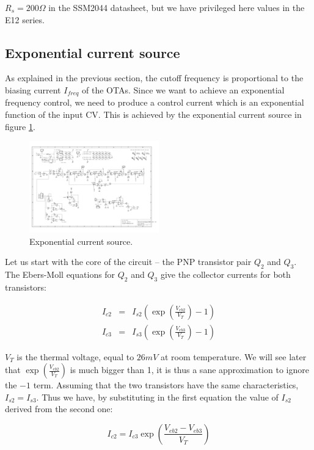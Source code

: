 \documentclass[a4paper,11pt]{article}
\begin{document}
$R_s = 200 \Omega$ in the SSM2044 datasheet, but we have privileged here values in the E12 series.

\subsection{Exponential current source}

As explained in the previous section, the cutoff frequency is proportional to the biasing current $I_{freq}$ of the OTAs. Since we want to achieve an exponential frequency control, we need to produce a control current which is an exponential function of the input CV. This is achieved by the exponential current source in figure \ref{fig:expo}.

\begin{figure}
\centering
\includegraphics[width=0.5\textwidth]{smr4mkII_expo_current_source.pdf}
\caption{Exponential current source.}
\label{fig:expo}
\end{figure}

Let us start with the core of the circuit -- the PNP transistor pair $Q_2$ and $Q_3$. The Ebers-Moll equations for $Q_2$ and $Q_3$ give the collector currents for both transistors:

\begin{eqnarray}
I_{c2} &=& I_{s2} \left(\exp \left( \frac{V_{eb2}}{V_T} \right) - 1 \right) \\
I_{c3} &=& I_{s3} \left(\exp \left( \frac{V_{eb3}}{V_T} \right) - 1 \right)
\end{eqnarray}

$V_T$ is the thermal voltage, equal to $26 mV$ at room temperature. We will see later that $\exp \left( \frac{V_{eb2}}{V_T} \right)$ is much bigger than 1, it is thus a sane approximation to ignore the $- 1$ term. Assuming that the two transistors have the same characteristics, $I_{s2} = I_{s3}$. Thus we have, by substituting in the first equation the value of $I_{s2}$ derived from the second one:

\begin{equation}
I_{c2} = I_{c3} \exp \left( \frac{V_{eb2} - V_{eb3}}{V_T} \right)
\end{equation}
\end{document}
